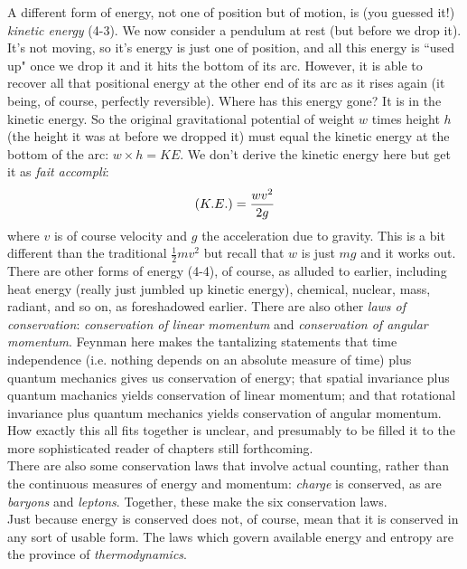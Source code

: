 \documentclass[10pt,letterpaper]{article}
\begin{document}
\indent A different form of energy, not one of position but of motion, is (you guessed it!) \textit{kinetic energy} (4-3). We now consider a pendulum at rest (but before we drop it). It's not moving, so it's energy is just one of position, and all this energy is ``used up" once we drop it and it hits the bottom of its arc. However, it is able to recover all that positional energy at the other end of its arc as it rises again (it being, of course, perfectly reversible). Where has this energy gone? It is in the kinetic energy. So the original gravitational potential of weight $w$ times height $h$ (the height it was at before we dropped it) must equal the kinetic energy at the bottom of the arc: $w \times h = KE$. We don't derive the kinetic energy here but get it as \textit{fait accompli}:
$$
\textrm(K.E.) = \frac{wv^2}{2g}
$$
where $v$ is of course velocity and $g$ the acceleration due to gravity. This is a bit different than the traditional $\frac{1}{2}mv^2$ but recall that $w$ is just $mg$ and it works out. \\

\indent There are other forms of energy (4-4), of course, as alluded to earlier, including heat energy (really just jumbled up kinetic energy), chemical, nuclear, mass, radiant, and so on, as foreshadowed earlier. There are also other \textit{laws of conservation}: \textit{conservation of linear momentum} and \textit{conservation of angular momentum}. Feynman here makes the tantalizing statements that time independence (i.e. nothing depends on an absolute measure of time) plus quantum mechanics gives us conservation of energy; that spatial invariance plus quantum machanics yields conservation of linear momentum; and that rotational invariance plus quantum mechanics yields conservation of angular momentum. How exactly this all fits together is unclear, and presumably to be filled it to the more sophisticated reader of chapters still forthcoming.\\

\indent There are also some conservation laws that involve actual counting, rather than the continuous measures of energy and momentum: \textit{charge} is conserved, as are \textit{baryons} and \textit{leptons}. Together, these make the six conservation laws. \\

\indent Just because energy is conserved does not, of course, mean that it is conserved in any sort of usable form. The laws which govern available energy and entropy are the province of \textit{thermodynamics}. 
\end{document}
